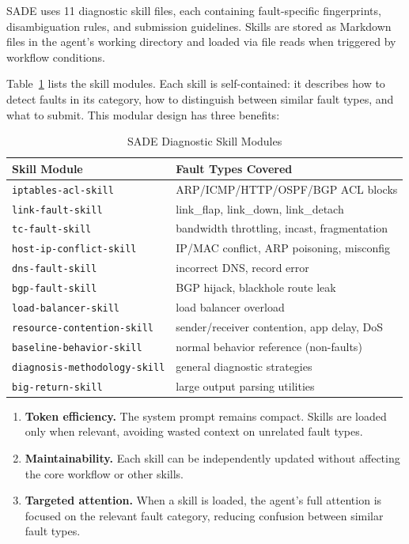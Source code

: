 \documentclass[conference]{IEEEtran}
\begin{document}
SADE uses 11 diagnostic skill files, each containing fault-specific fingerprints, disambiguation rules, and submission guidelines. Skills are stored as Markdown files in the agent's working directory and loaded via file reads when triggered by workflow conditions.

Table~\ref{tab:skills} lists the skill modules. Each skill is self-contained: it describes how to detect faults in its category, how to distinguish between similar fault types, and what to submit. This modular design has three benefits:

\begin{table}[t]
\centering
\caption{SADE Diagnostic Skill Modules}
\label{tab:skills}
\small
\begin{tabular}{@{}ll@{}}
\toprule
\textbf{Skill Module} & \textbf{Fault Types Covered} \\
\midrule
\texttt{iptables-acl-skill} & ARP/ICMP/HTTP/OSPF/BGP ACL blocks \\
\texttt{link-fault-skill} & link\_flap, link\_down, link\_detach \\
\texttt{tc-fault-skill} & bandwidth throttling, incast, fragmentation \\
\texttt{host-ip-conflict-skill} & IP/MAC conflict, ARP poisoning, misconfig \\
\texttt{dns-fault-skill} & incorrect DNS, record error \\
\texttt{bgp-fault-skill} & BGP hijack, blackhole route leak \\
\texttt{load-balancer-skill} & load balancer overload \\
\texttt{resource-contention-skill} & sender/receiver contention, app delay, DoS \\
\texttt{baseline-behavior-skill} & normal behavior reference (non-faults) \\
\texttt{diagnosis-methodology-skill} & general diagnostic strategies \\
\texttt{big-return-skill} & large output parsing utilities \\
\bottomrule
\end{tabular}
\end{table}

\begin{enumerate}    \item \textbf{Token efficiency.} The system prompt remains compact. Skills are loaded only when relevant, avoiding wasted context on unrelated fault types.
    \item \textbf{Maintainability.} Each skill can be independently updated without affecting the core workflow or other skills.
    \item \textbf{Targeted attention.} When a skill is loaded, the agent's full attention is focused on the relevant fault category, reducing confusion between similar fault types.
\end{enumerate}
\end{document}
